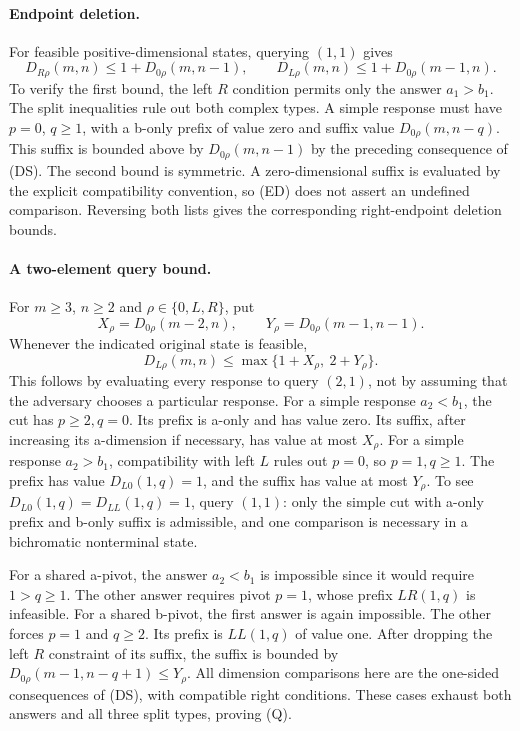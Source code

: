 \documentclass[11pt]{article}
\theoremstyle{definition}
\theoremstyle{remark}
\begin{document}
\paragraph{Endpoint deletion.}
For feasible positive-dimensional states, querying $(1,1)$ gives
\begin{equation}
 D_{R\rho}(m,n)\le1+D_{0\rho}(m,n-1),\qquad
 D_{L\rho}(m,n)\le1+D_{0\rho}(m-1,n).
 \tag{ED}
\end{equation}
To verify the first bound, the left $R$ condition permits only the answer
$a_1>b_1$. The split inequalities rule out both complex types. A simple
response must have $p=0$, $q\ge1$, with a b-only prefix of value zero and
suffix value $D_{0\rho}(m,n-q)$. This suffix is bounded above by
$D_{0\rho}(m,n-1)$ by the preceding consequence of (DS). The second bound
is symmetric. A zero-dimensional suffix is evaluated by the explicit
compatibility convention, so (ED) does not assert an undefined comparison.
Reversing both lists gives the corresponding right-endpoint deletion bounds.

\paragraph{A two-element query bound.}
For $m\ge3$, $n\ge2$ and $\rho\in\{0,L,R\}$, put
\[
 X_\rho=D_{0\rho}(m-2,n),\qquad
 Y_\rho=D_{0\rho}(m-1,n-1).
\]
Whenever the indicated original state is feasible,
\begin{equation}
 D_{L\rho}(m,n)\le\max\{1+X_\rho,\ 2+Y_\rho\}.
 \tag{Q}
\end{equation}
This follows by evaluating every response to query $(2,1)$, not by
assuming that the adversary chooses a particular response.
For a simple response $a_2<b_1$, the cut has $p\ge2,q=0$. Its prefix is
a-only and has value zero. Its suffix, after increasing its a-dimension
if necessary, has value at most $X_\rho$. For a simple response $a_2>b_1$,
compatibility with left $L$ rules out $p=0$, so $p=1,q\ge1$. The prefix has
value $D_{L0}(1,q)=1$, and the suffix has value at most $Y_\rho$.
To see $D_{L0}(1,q)=D_{LL}(1,q)=1$, query $(1,1)$: only the simple cut with
a-only prefix and b-only suffix is admissible, and one comparison is
necessary in a bichromatic nonterminal state.

For a shared a-pivot, the answer $a_2<b_1$ is impossible since it would
require $1>q\ge1$. The other answer requires pivot $p=1$, whose prefix
$LR(1,q)$ is infeasible. For a shared b-pivot, the first answer is again
impossible. The other forces $p=1$ and $q\ge2$. Its prefix is
$LL(1,q)$ of value one. After dropping the left $R$ constraint of its
suffix, the suffix is bounded by
$D_{0\rho}(m-1,n-q+1)\le Y_\rho$. All dimension comparisons here are the
one-sided consequences of (DS), with compatible right conditions.
These cases exhaust both answers and all three split types, proving (Q).
\end{document}
